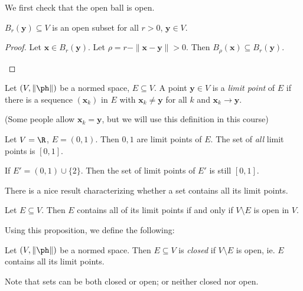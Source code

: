 \documentclass[a4paper]{article}
\begin{document}
We first check that the open ball is open.
\begin{prop}
  $B_r(\mathbf{y})\subseteq V$ is an open subset for all $r > 0$, $\mathbf{y} \in V$.
\end{prop}

\begin{proof}
  Let $\mathbf{x} \in B_r(\mathbf{y})$. Let $\rho = r - \|\mathbf{x} - \mathbf{y}\| > 0$. Then $B_\rho(\mathbf{x}) \subseteq B_r(\mathbf{y})$.
  \begin{center}
  \end{center}
\end{proof}

\begin{defi}
  Let $(V, \|\ph\|)$ be a normed space, $E\subseteq V$. A point $\mathbf{y} \in V$ is a \emph{limit point} of $E$ if there is a sequence $(\mathbf{x}_k)$ in $E$ with $\mathbf{x}_k \not= \mathbf{y}$ for all $k$ and $\mathbf{x}_k \to \mathbf{y}$.
\end{defi}
(Some people allow $\mathbf{x}_k = \mathbf{y}$, but we will use this definition in this course)

\begin{eg}
  Let $V = \R$, $E = (0, 1)$. Then $0, 1$ are limit points of $E$. The set of \emph{all} limit points is $[0, 1]$.

  If $E' = (0, 1) \cup \{2\}$. Then the set of limit points of $E'$ is still $[0, 1]$.
\end{eg}

There is a nice result characterizing whether a set contains all its limit points.
\begin{prop}
  Let $E\subseteq V$. Then $E$ contains all of its limit points if and only if $V\setminus E$ is open in $V$.
\end{prop}

Using this proposition, we define the following:
\begin{defi}
  Let $(V, \|\ph\|)$ be a normed space. Then $E\subseteq V$ is \emph{closed} if $V\setminus E$ is open, ie. $E$ contains all its limit points.
\end{defi}
Note that sets can be both closed or open; or neither closed nor open.
\end{document}
